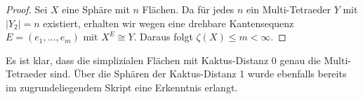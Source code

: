 \documentclass[12pt,titlepage,twoside,cleardoublepage]{article}
\theoremstyle{nummermitklammern}
\numberwithin{equation}{section}
\DeclareMathOperator{\Pot}{Pot}
\begin{document}
\begin{proof}

Sei $X$ eine Sphäre mit $n$ Flächen. Da für jedes $n$ ein  Multi-Tetraeder $Y$ mit $\vert Y_2\vert =n$ existiert, erhalten wir wegen  eine drehbare Kantensequenz $E=(e_1,\ldots,e_m)$ mit $X^E\cong Y$. Daraus folgt $\zeta(X)\leq m<\infty.$ 

\end{proof}
Es ist klar, dass die simplizialen Flächen mit Kaktus-Distanz $0$ genau die Multi-Tetraeder sind. Über die Sphären der Kaktus-Distanz 1 wurde ebenfalls bereits im zugrundeliegendem Skript eine Erkenntnis erlangt.
\end{document}
